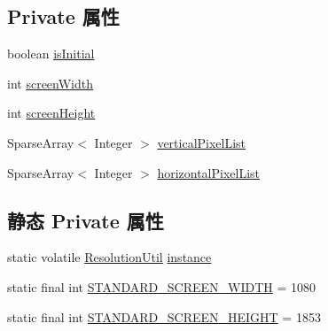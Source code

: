 \subsection*{Private 属性}
\begin{DoxyCompactItemize}
\item 
boolean \mbox{\hyperlink{classcom_1_1example_1_1akisame__lin_1_1love__air2_1_1_bean_1_1_resolution_util_ac1f9c5af54be009a9bfbb2b32c15eaad}{is\+Initial}}
\item 
int \mbox{\hyperlink{classcom_1_1example_1_1akisame__lin_1_1love__air2_1_1_bean_1_1_resolution_util_ab09e8120303a0f3482dc572f125aca2f}{screen\+Width}}
\item 
int \mbox{\hyperlink{classcom_1_1example_1_1akisame__lin_1_1love__air2_1_1_bean_1_1_resolution_util_ac967d7f31893391497656d34a6e227be}{screen\+Height}}
\item 
Sparse\+Array$<$ Integer $>$ \mbox{\hyperlink{classcom_1_1example_1_1akisame__lin_1_1love__air2_1_1_bean_1_1_resolution_util_a0238a7b21c381b7e4964b0289e03101b}{vertical\+Pixel\+List}}
\item 
Sparse\+Array$<$ Integer $>$ \mbox{\hyperlink{classcom_1_1example_1_1akisame__lin_1_1love__air2_1_1_bean_1_1_resolution_util_a1927a1ef24ad230cf1981e5acaa6b7f2}{horizontal\+Pixel\+List}}
\end{DoxyCompactItemize}
\subsection*{静态 Private 属性}
\begin{DoxyCompactItemize}
\item 
static volatile \mbox{\hyperlink{classcom_1_1example_1_1akisame__lin_1_1love__air2_1_1_bean_1_1_resolution_util}{Resolution\+Util}} \mbox{\hyperlink{classcom_1_1example_1_1akisame__lin_1_1love__air2_1_1_bean_1_1_resolution_util_a5e61ea4fd906e5c09bec3e1d63c43dd4}{instance}}
\item 
static final int \mbox{\hyperlink{classcom_1_1example_1_1akisame__lin_1_1love__air2_1_1_bean_1_1_resolution_util_abec01ab6edcc4cfbb8f302855203cdfa}{S\+T\+A\+N\+D\+A\+R\+D\+\_\+\+S\+C\+R\+E\+E\+N\+\_\+\+W\+I\+D\+TH}} = 1080
\item 
static final int \mbox{\hyperlink{classcom_1_1example_1_1akisame__lin_1_1love__air2_1_1_bean_1_1_resolution_util_acb993c8d832ebc9cbbe7b67d0edb8b48}{S\+T\+A\+N\+D\+A\+R\+D\+\_\+\+S\+C\+R\+E\+E\+N\+\_\+\+H\+E\+I\+G\+HT}} = 1853
\end{DoxyCompactItemize}


